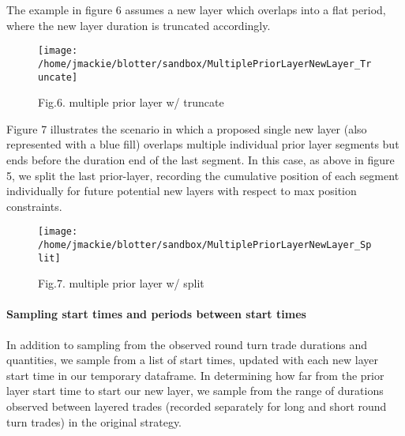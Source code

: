 The example in figure 6 assumes a new layer which overlaps into a flat
period, where the new layer duration is truncated accordingly.

\begin{Schunk}
\begin{figure}

{\centering \texttt{[image: /home/jmackie/blotter/sandbox/MultiplePriorLayerNewLayer\_Truncate]} 

}

\caption[Fig.6]{Fig.6. multiple prior layer w/ truncate}\label{fig:MultiplePriorLayerNewLayer_Truncate diagram}
\end{figure}
\end{Schunk}

Figure 7 illustrates the scenario in which a proposed single new layer
(also represented with a blue fill) overlaps multiple individual prior
layer segments but ends before the duration end of the last segment. In
this case, as above in figure 5, we split the last prior-layer,
recording the cumulative position of each segment individually for
future potential new layers with respect to max position constraints.

\begin{Schunk}
\begin{figure}

{\centering \texttt{[image: /home/jmackie/blotter/sandbox/MultiplePriorLayerNewLayer\_Split]} 

}

\caption[Fig.7]{Fig.7. multiple prior layer w/ split}\label{fig:MultiplePriorLayerNewLayer_Split diagram}
\end{figure}
\end{Schunk}

\hypertarget{sampling-start-times-and-periods-between-start-times}{%
\paragraph{Sampling start times and periods between start
times}\label{sampling-start-times-and-periods-between-start-times}}

In addition to sampling from the observed round turn trade durations and
quantities, we sample from a list of start times, updated with each new
layer start time in our temporary dataframe. In determining how far from
the prior layer start time to start our new layer, we sample from the
range of durations observed between layered trades (recorded separately
for long and short round turn trades) in the original strategy.

